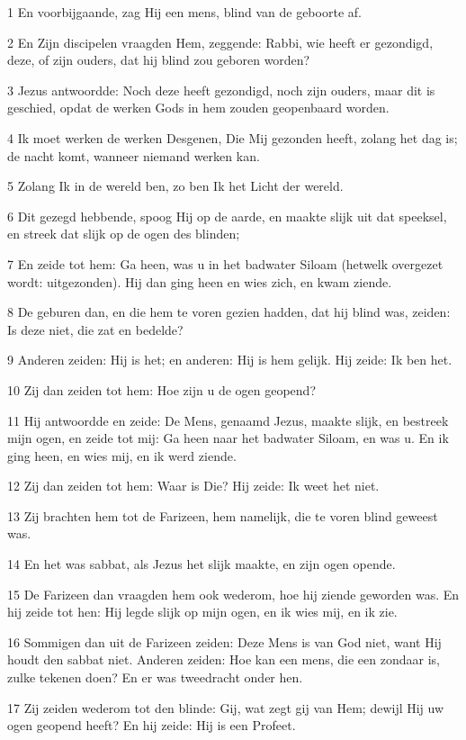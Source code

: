 \par 1 En voorbijgaande, zag Hij een mens, blind van de geboorte af.
\par 2 En Zijn discipelen vraagden Hem, zeggende: Rabbi, wie heeft er gezondigd, deze, of zijn ouders, dat hij blind zou geboren worden?
\par 3 Jezus antwoordde: Noch deze heeft gezondigd, noch zijn ouders, maar dit is geschied, opdat de werken Gods in hem zouden geopenbaard worden.
\par 4 Ik moet werken de werken Desgenen, Die Mij gezonden heeft, zolang het dag is; de nacht komt, wanneer niemand werken kan.
\par 5 Zolang Ik in de wereld ben, zo ben Ik het Licht der wereld.
\par 6 Dit gezegd hebbende, spoog Hij op de aarde, en maakte slijk uit dat speeksel, en streek dat slijk op de ogen des blinden;
\par 7 En zeide tot hem: Ga heen, was u in het badwater Siloam (hetwelk overgezet wordt: uitgezonden). Hij dan ging heen en wies zich, en kwam ziende.
\par 8 De geburen dan, en die hem te voren gezien hadden, dat hij blind was, zeiden: Is deze niet, die zat en bedelde?
\par 9 Anderen zeiden: Hij is het; en anderen: Hij is hem gelijk. Hij zeide: Ik ben het.
\par 10 Zij dan zeiden tot hem: Hoe zijn u de ogen geopend?
\par 11 Hij antwoordde en zeide: De Mens, genaamd Jezus, maakte slijk, en bestreek mijn ogen, en zeide tot mij: Ga heen naar het badwater Siloam, en was u. En ik ging heen, en wies mij, en ik werd ziende.
\par 12 Zij dan zeiden tot hem: Waar is Die? Hij zeide: Ik weet het niet.
\par 13 Zij brachten hem tot de Farizeen, hem namelijk, die te voren blind geweest was.
\par 14 En het was sabbat, als Jezus het slijk maakte, en zijn ogen opende.
\par 15 De Farizeen dan vraagden hem ook wederom, hoe hij ziende geworden was. En hij zeide tot hen: Hij legde slijk op mijn ogen, en ik wies mij, en ik zie.
\par 16 Sommigen dan uit de Farizeen zeiden: Deze Mens is van God niet, want Hij houdt den sabbat niet. Anderen zeiden: Hoe kan een mens, die een zondaar is, zulke tekenen doen? En er was tweedracht onder hen.
\par 17 Zij zeiden wederom tot den blinde: Gij, wat zegt gij van Hem; dewijl Hij uw ogen geopend heeft? En hij zeide: Hij is een Profeet.
